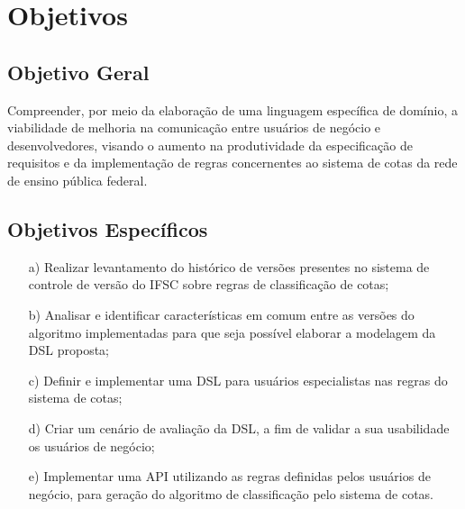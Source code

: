 \section{Objetivos}
\label{objetivos}

\subsection{Objetivo Geral}
\label{objetivogeral}

Compreender, por meio da elaboração de uma linguagem específica de domínio, a viabilidade de melhoria na comunicação entre usuários de negócio e desenvolvedores, visando o aumento na produtividade da especificação de requisitos e da implementação de regras concernentes ao sistema de cotas da rede de ensino pública federal. 


\subsection{Objetivos Específicos}
\label{objetivosespecificos}

\begin{enumerate}
    \item[a)] Realizar levantamento do histórico de versões presentes no sistema de controle de versão do \gls{IFSC} sobre regras de classificação de cotas;
    \item[b)] Analisar e identificar características em comum entre as versões do algoritmo implementadas para que seja possível elaborar a modelagem da \gls{DSL} proposta;
    \item[c)] Definir e implementar uma \gls{DSL} para usuários especialistas nas regras do sistema de cotas;
    \item[d)] Criar um cenário de avaliação da DSL, a fim de validar a sua usabilidade os usuários de negócio;
    \item[e)] Implementar uma \gls{API} utilizando as regras definidas pelos usuários de negócio, para geração do algoritmo de classificação pelo sistema de cotas.
\end{enumerate}{}